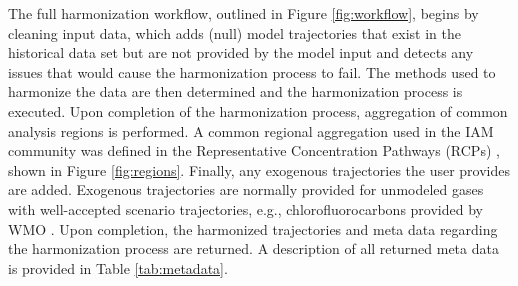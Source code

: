 \documentclass[review]{elsarticle}
\newcommand{\code}[1]{\lstinline[basicstyle=\ttfamily\color{black}]|#1|}
\begin{document}

The full harmonization workflow, outlined in Figure \ref{fig:workflow}, begins by
cleaning input data, which adds (null) model trajectories that exist in the
historical data set but are not provided by the model input and detects any
issues that would cause the harmonization process to fail. The methods used to
harmonize the data are then determined and the harmonization process is
executed. Upon completion of the harmonization process, aggregation of common
analysis regions is performed. A common regional aggregation used in the IAM
community was defined in the Representative Concentration Pathways (RCPs)
\cite{vuuren_representative_2011}, shown in Figure \ref{fig:regions}. Finally,
any exogenous trajectories the user provides are added. Exogenous trajectories
are normally provided for unmodeled gases with well-accepted scenario
trajectories, e.g., chlorofluorocarbons provided by WMO \cite{wmo2014}. Upon
completion, the harmonized trajectories and meta data regarding the
harmonization process are returned. A description of all returned meta data is
provided in Table \ref{tab:metadata}.
\end{document}
